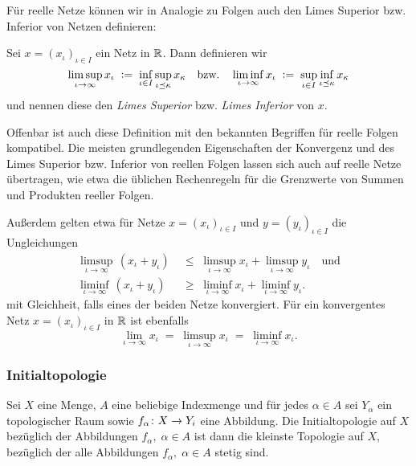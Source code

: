 \documentclass[../main/main.tex]{subfiles}
\begin{document}
	Für reelle Netze können wir in Analogie zu Folgen auch den Limes Superior bzw. Inferior von Netzen definieren:
	
	\begin{Definition}
		Sei $x = (x_\iota)_{\iota \in I}$ ein Netz in $\mathbb{R}$. Dann definieren wir 
		\[ \limsup_{\iota \to \infty} x_\iota \; \vcentcolon = \; \inf_{\iota \in I} \sup_{\iota \preceq \kappa} x_\kappa \quad \text{bzw.} \quad 
		\liminf_{\iota \to \infty} x_\iota \; \vcentcolon = \; \sup_{\iota \in I} \inf_{\iota \preceq \kappa} x_\kappa \]
		und nennen diese den \emph{Limes Superior} bzw. \emph{Limes Inferior} von $x$.
	\end{Definition}
	
	\begin{Bemerkung}
		Offenbar ist auch diese Definition mit den bekannten Begriffen für reelle Folgen kompatibel. Die meisten grundlegenden Eigenschaften der Konvergenz und des 
		Limes Superior bzw. Inferior von reellen Folgen lassen sich auch auf reelle Netze übertragen, 
		wie etwa die üblichen Rechenregeln für die Grenzwerte von Summen und Produkten reeller Folgen.
		
		Außerdem gelten etwa für Netze $x = (x_\iota)_{\iota \in I}$ und
		$y = (y_\iota)_{\iota \in I}$ die Ungleichungen
		\begin{align*}
			\limsup_{\iota \to \infty} \, (x_\iota + y_\iota) \; &\leq \; \limsup_{\iota \to \infty} x_\iota + \limsup_{\iota \to \infty} y_\iota \quad \text{und}\\
			\liminf_{\iota \to \infty} \, (x_\iota + y_\iota) \; &\geq \; \liminf_{\iota \to \infty} x_\iota + \liminf_{\iota \to \infty} y_\iota \text{.}
		\end{align*}
		mit Gleichheit, falls eines der beiden Netze konvergiert.
		Für ein konvergentes Netz $x = (x_\iota)_{\iota \in I}$ in $\mathbb{R}$ ist ebenfalls
		\[ \lim_{\iota \to \infty} x_\iota \; = \; \limsup_{\iota \to \infty} x_\iota \; = \; \liminf_{\iota \to \infty} x_\iota \text{.} \]
	\end{Bemerkung}
	
	\subsubsection*{Initialtopologie}
	
	\begin{Definition}[Initialtopologie]
		\label{def:initialtopology}
		Sei $X$ eine Menge, $A$ eine beliebige Indexmenge und für jedes $\alpha \in A$ sei $Y_\alpha$ ein topologischer Raum sowie $f_\alpha \colon X \to Y_i$ eine Abbildung.
		Die Initialtopologie auf $X$ bezüglich der Abbildungen $f_\alpha, \; \alpha \in A$ ist dann die kleinste Topologie auf $X$, bezüglich der alle Abbildungen 
		$f_\alpha, \; \alpha \in A$ stetig sind.
	\end{Definition}
\end{document}
